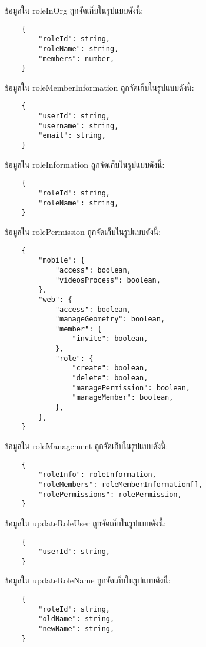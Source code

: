 ข้อมูลใน roleInOrg ถูกจัดเก็บในรูปแบบดังนี้:
\begin{lstlisting}
    {
        "roleId": string,
        "roleName": string,
        "members": number,
    }
\end{lstlisting}

\clearpage

ข้อมูลใน roleMemberInformation ถูกจัดเก็บในรูปแบบดังนี้:
\begin{lstlisting}
    {
        "userId": string,
        "username": string,
        "email": string,
    }
\end{lstlisting}

ข้อมูลใน roleInformation ถูกจัดเก็บในรูปแบบดังนี้:
\begin{lstlisting}
    {
        "roleId": string,
        "roleName": string,
    }
\end{lstlisting}

ข้อมูลใน rolePermission ถูกจัดเก็บในรูปแบบดังนี้:
\begin{lstlisting}
    {
        "mobile": {
            "access": boolean,
            "videosProcess": boolean,
        },
        "web": {
            "access": boolean,
            "manageGeometry": boolean,
            "member": {
                "invite": boolean,
            },
            "role": {
                "create": boolean,
                "delete": boolean,
                "managePermission": boolean,
                "manageMember": boolean,
            },
        },
    }
\end{lstlisting}

ข้อมูลใน roleManagement ถูกจัดเก็บในรูปแบบดังนี้:
\begin{lstlisting}
    {
        "roleInfo": roleInformation,
        "roleMembers": roleMemberInformation[],
        "rolePermissions": rolePermission,
    }
\end{lstlisting}

ข้อมูลใน updateRoleUser ถูกจัดเก็บในรูปแบบดังนี้:
\begin{lstlisting}
    {
        "userId": string,
    }
\end{lstlisting}

ข้อมูลใน updateRoleName ถูกจัดเก็บในรูปแบบดังนี้:
\begin{lstlisting}
    {
        "roleId": string,
        "oldName": string,
        "newName": string,
    }
\end{lstlisting}
\fi